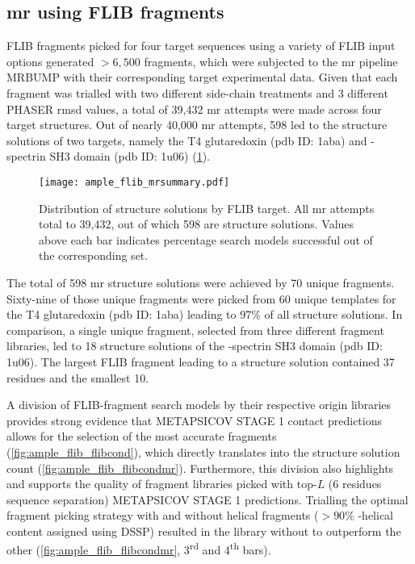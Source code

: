 \subsection{\acrlong{mr} using FLIB fragments}
FLIB fragments picked for four target sequences using a variety of FLIB input options generated $>6,500$ fragments, which were subjected to the \gls{mr} pipeline MRBUMP with their corresponding target experimental data. Given that each fragment was trialled with two different side-chain treatments and 3 different PHASER \gls{rmsd} values, a total of 39,432 \gls{mr} attempts were made across four target structures. Out of nearly 40,000 \gls{mr} attempts, 598 led to the structure solutions of two targets, namely the T4 glutaredoxin (\gls{pdb} ID: 1aba) and \textalpha-spectrin SH3 domain (\gls{pdb} ID: 1u06) (\cref{fig:ample_flib_mrsummary}).

\begin{figure}[H]
	\centering
	\texttt{[image: ample\_flib\_mrsummary.pdf]}
	\caption[MR structure solutions by FLIB target]{Distribution of structure solutions by FLIB target. All \gls{mr} attempts total to 39,432, out of which 598 are structure solutions. Values above each bar indicates percentage search models successful out of the corresponding set.}
	\label{fig:ample_flib_mrsummary}
\end{figure}

The total of 598 \gls{mr} structure solutions were achieved by 70 unique fragments. Sixty-nine of those unique fragments were picked from 60 unique templates for the T4 glutaredoxin (\gls{pdb} ID: 1aba) leading to 97\% of all structure solutions. In comparison, a single unique fragment, selected from three different fragment libraries, led to 18 structure solutions of the \textalpha-spectrin SH3 domain (\gls{pdb} ID: 1u06). The largest FLIB fragment leading to a structure solution contained 37 residues and the smallest 10.

A division of FLIB-fragment search models by their respective origin libraries provides strong evidence that METAPSICOV STAGE 1 contact predictions allows for the selection of the most accurate fragments (\cref{fig:ample_flib_flibcond}), which directly translates into the structure solution count (\cref{fig:ample_flib_flibcondmr}). Furthermore, this division also highlights and supports the quality of fragment libraries picked with top-$L$ (6 residues sequence separation) METAPSICOV STAGE 1 predictions. Trialling the optimal fragment picking strategy with and without helical fragments ($>90$\% \textalpha-helical content assigned using DSSP) resulted in the library without to outperform the other (\cref{fig:ample_flib_flibcondmr}, 3\textsuperscript{rd} and 4\textsuperscript{th} bars). 

